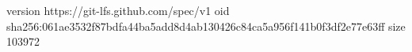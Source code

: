version https://git-lfs.github.com/spec/v1
oid sha256:061ae3532f87bdfa44ba5add8d4ab130426c84ca5a956f141b0f3df2e77e63ff
size 103972

